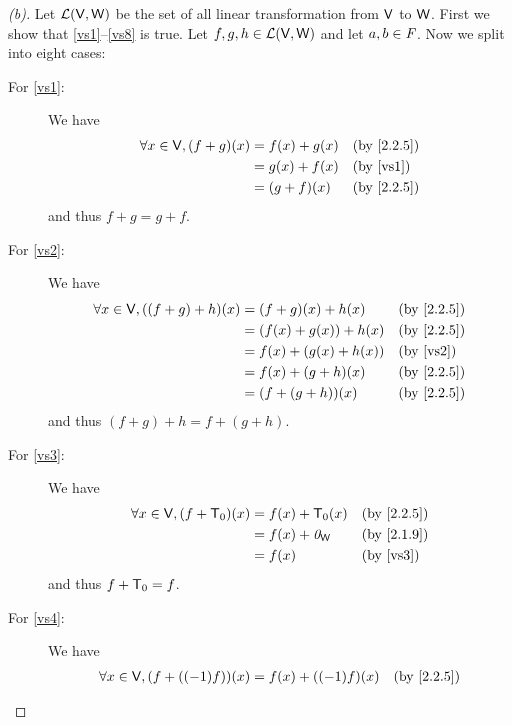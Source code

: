 \begin{proof}[(b)]
  Let \(\mathcal{L}(\mathsf{V}, \mathsf{W})\) be the set of all linear transformation from \(\mathsf{V}\) to \(\mathsf{W}\).
  First we show that \ref{vs1}--\ref{vs8} is true.
  Let \(f, g, h \in \mathcal{L}(\mathsf{V}, \mathsf{W})\) and let \(a, b \in \mathit{F}\).
  Now we split into eight cases:
  \begin{description}
    \item[For \ref{vs1}:] We have
      \begin{align*}
        \forall x \in \V, (f + g)(x) & = f(x) + g(x) &  & \text{(by \cref{2.2.5})} \\
                                     & = g(x) + f(x) &  & \text{(by \ref{vs1})}    \\
                                     & = (g + f)(x)  &  & \text{(by \cref{2.2.5})}
      \end{align*}
      and thus \(f + g = g + f\).
    \item[For \ref{vs2}:] We have
      \begin{align*}
        \forall x \in \V, ((f + g) + h)(x) & = (f + g)(x) + h(x)    &  & \text{(by \cref{2.2.5})} \\
                                           & = (f(x) + g(x)) + h(x) &  & \text{(by \cref{2.2.5})} \\
                                           & = f(x) + (g(x) + h(x)) &  & \text{(by \ref{vs2})}    \\
                                           & = f(x) + (g + h)(x)    &  & \text{(by \cref{2.2.5})} \\
                                           & = (f + (g + h))(x)     &  & \text{(by \cref{2.2.5})}
      \end{align*}
      and thus \((f + g) + h = f + (g + h)\).
    \item[For \ref{vs3}:] We have
      \begin{align*}
        \forall x \in \V, (f + \zT)(x) & = f(x) + \zT(x)   &  & \text{(by \cref{2.2.5})} \\
                                       & = f(x) + \zv_{\W} &  & \text{(by \cref{2.1.9})} \\
                                       & = f(x)            &  & \text{(by \ref{vs3})}
      \end{align*}
      and thus \(f + \mathsf{T}_0 = f\).
    \item[For \ref{vs4}:] We have
      \begin{align*}
        \forall x \in \V, (f + ((-1)f))(x) & = f(x) + ((-1)f)(x) &  & \text{(by \cref{2.2.5})} \\

\end{align*}
\end{description}
\end{proof}
